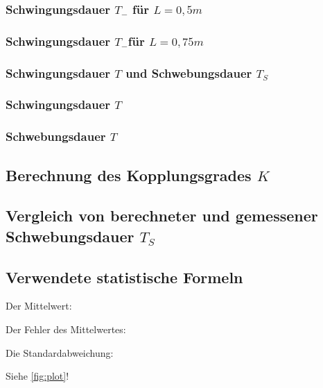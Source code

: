 \subsubsection{Schwingungsdauer $T_-$ für $L=0,5m$}
\subsubsection{Schwingungsdauer $T_-$für $L=0,75m$}
\subsubsection{Schwingungsdauer $T$ und Schwebungsdauer $T_S$}
\subsubsection{Schwingungsdauer $T$}
\subsubsection{Schwebungsdauer $T$}
\subsection{Berechnung des Kopplungsgrades $K$}
\subsection{Vergleich von berechneter und gemessener Schwebungsdauer $T_S$}
\subsection{Verwendete statistische Formeln}
Der Mittelwert:
\begin{center}
  
\end{center}

Der Fehler des Mittelwertes:
\begin{center}
  
\end{center}

Die Standardabweichung:
\begin{center}
  
\end{center}
Siehe \autoref{fig:plot}!
